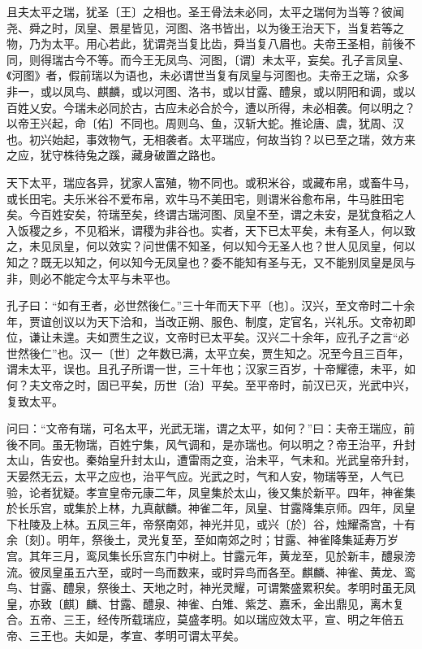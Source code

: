 \documentclass[]{article}
\begin{document}
且夫太平之瑞，犹圣〔王〕之相也。圣王骨法未必同，太平之瑞何为当等？彼闻尧、舜之时，凤皇、景星皆见，河图、洛书皆出，以为後王治天下，当复若等之物，乃为太平。用心若此，犹谓尧当复比齿，舜当复八眉也。夫帝王圣相，前後不同，则得瑞古今不等。而今王无凤鸟、河图，〔谓〕未太平，妄矣。孔子言凤皇、《河图》者，假前瑞以为语也，未必谓世当复有凤皇与河图也。夫帝王之瑞，众多非一，或以凤鸟、麒麟，或以河图、洛书，或以甘露、醴泉，或以阴阳和调，或以百姓乂安。今瑞未必同於古，古应未必合於今，遭以所得，未必相袭。何以明之？以帝王兴起，命〔佑〕不同也。周则乌、鱼，汉斩大蛇。推论唐、虞，犹周、汉也。初兴始起，事效物气，无相袭者。太平瑞应，何故当钧？以已至之瑞，效方来之应，犹守株待兔之蹊，藏身破置之路也。

天下太平，瑞应各异，犹家人富殖，物不同也。或积米谷，或藏布帛，或畜牛马，或长田宅。夫乐米谷不爱布帛，欢牛马不美田宅，则谓米谷愈布帛，牛马胜田宅矣。今百姓安矣，符瑞至矣，终谓古瑞河图、凤皇不至，谓之未安，是犹食稻之人入饭稷之乡，不见稻米，谓稷为非谷也。实者，天下已太平矣，未有圣人，何以致之，未见凤皇，何以效实？问世儒不知圣，何以知今无圣人也？世人见凤皇，何以知之？既无以知之，何以知今无凤皇也？委不能知有圣与无，又不能别凤皇是凤与非，则必不能定今太平与未平也。

孔子曰：``如有王者，必世然後仁。''三十年而天下平〔也〕。汉兴，至文帝时二十余年，贾谊创议以为天下洽和，当改正朔、服色、制度，定官名，兴礼乐。文帝初即位，谦让未遑。夫如贾生之议，文帝时已太平矣。汉兴二十余年，应孔子之言``必世然後仁''也。汉一〔世〕之年数已满，太平立矣，贾生知之。况至今且三百年，谓未太平，误也。且孔子所谓一世，三十年也；汉家三百岁，十帝耀德，未平，如何？夫文帝之时，固已平矣，历世〔治〕平矣。至平帝时，前汉已灭，光武中兴，复致太平。

问曰：``文帝有瑞，可名太平，光武无瑞，谓之太平，如何？''曰：夫帝王瑞应，前後不同。虽无物瑞，百姓宁集，风气调和，是亦瑞也。何以明之？帝王治平，升封太山，告安也。秦始皇升封太山，遭雷雨之变，治未平，气未和。光武皇帝升封，天晏然无云，太平之应也，治平气应。光武之时，气和人安，物瑞等至，人气已验，论者犹疑。孝宣皇帝元康二年，凤皇集於太山，後又集於新平。四年，神雀集於长乐宫，或集於上林，九真献麟。神雀二年，凤皇、甘露降集京师。四年，凤皇下杜陵及上林。五凤三年，帝祭南郊，神光并见，或兴〔於〕谷，烛耀斋宫，十有余〔刻〕。明年，祭後土，灵光复至，至如南郊之时；甘露、神雀降集延寿万岁宫。其年三月，鸾凤集长乐宫东门中树上。甘露元年，黄龙至，见於新丰，醴泉滂流。彼凤皇虽五六至，或时一鸟而数来，或时异鸟而各至。麒麟、神雀、黄龙、鸾鸟、甘露、醴泉，祭後土、天地之时，神光灵耀，可谓繁盛累积矣。孝明时虽无凤皇，亦致〔麒〕麟、甘露、醴泉、神雀、白雉、紫芝、嘉禾，金出鼎见，离木复合。五帝、三王，经传所载瑞应，莫盛孝明。如以瑞应效太平，宣、明之年倍五帝、三王也。夫如是，孝宣、孝明可谓太平矣。
\end{document}
